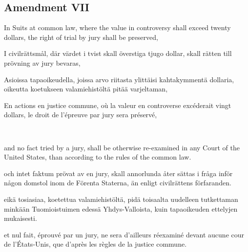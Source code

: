 \documentclass[a4,landscape,12pt]{article}
\begin{document}
\subsection*{Amendment VII}
\begin{minipage}[t]{0.22\textwidth}
In Suits at common law, where the value in controversy shall exceed twenty dollars, the right of trial by jury shall be preserved,
\end{minipage}\textwidth
\begin{minipage}[t]{0.22\textwidth}
I civilrättsmål, där värdet i tvist skall överstiga tjugo dollar, skall rätten till prövning av jury bevaras,
\end{minipage}\textwidth
\begin{minipage}[t]{0.22\textwidth}
Asioissa tapaoikeudella, joissa arvo riitasta ylittäisi kahtakymmentä dollaria, oikeutta koetukseen valamiehistöltä pitää varjeltaman,
\end{minipage}\textwidth
\begin{minipage}[t]{0.22\textwidth}
En actions en justice commune, où la valeur en controverse excéderait vingt dollars, le droit de l'épreuve par jury sera préservé,
\end{minipage}

~

\begin{minipage}[t]{0.22\textwidth}
and no fact tried by a jury, shall be otherwise re-examined in any Court of the United States, than according to the rules of the common law.
\end{minipage}\textwidth
\begin{minipage}[t]{0.22\textwidth}
och intet faktum prövat av en jury, skall annorlunda åter sättas i fråga inför någon domstol inom de Förenta Staterna, än enligt civilrättens förfaranden.
\end{minipage}\textwidth
\begin{minipage}[t]{0.22\textwidth}
eikä tosiasiaa, koetettua valamiehistöltä, pidä toisaalta uudelleen tutkettaman minkään Tuomioistuimen edessä Yhdys-Valloista, kuin tapaoikeuden ettelyjen mukaisesti.
\end{minipage}\textwidth
\begin{minipage}[t]{0.22\textwidth}
et nul fait, éprouvé par un jury, ne sera d'ailleurs réexaminé devant aucune cour de l'États-Unis, que d'après les règles de la justice commune.
\end{minipage}
\end{document}
